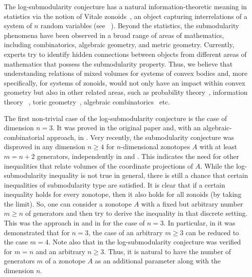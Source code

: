 \documentclass[11pt]{amsart}
\newcommand{\Ivan}[1]{\todo[size=\tiny,inline,color=green!30]{#1 \\ \hfill --- Vanya}}
\theoremstyle{definition}
\theoremstyle{remark}
\begin{document}
The log-submodularity conjecture %
has a natural information-theoretic meaning in statistics via the notion of Vitale zonoids~\cite{V}, an object capturing interrelations of a system of $n$ random variables (see ~\cite{CC,DCT,Md}). Beyond the statistics, the submodularity phenomena have been observed in a broad range of areas of mathematics, including combinatorics, algebraic geometry, and metric %
geometry. Currently, experts try to identify hidden connections between objects from different areas of mathematics that possess the submodularity property. Thus, %
we believe that understanding relations of mixed volumes for systems of convex bodies and, more specifically, for systems of zonoids, would not only have an impact %
within convex geometry but also in other related areas, such as probability theory~\cite{BBLM}, information theory ~\cite{CC, DCT, Md}, toric geometry~\cite{Ful, CLS}, algebraic combinatorics~\cite{BH, AH, Mur, Bjo} etc.

The first non-trivial case of the log-submodularity conjecture is the case of dimension $n=3$. It was proved in the original paper \cite{FMMZ} and, with an algebraic-combinatorial approach, in \cite{AS}. %
Very recently, the submodularity conjecture was disproved in any dimension $n \geq 4$ for $n$-dimensional zonotopes $A$ with at least $m = n+2$ generators, independently in \cite{FHMNZ} and \cite{Sko}.
This indicates the need for other inequalities that relate volumes of the coordinate projections of $A$. While the log-submodularity inequality is not true in general, there is still a chance that certain inequalities of submodularity type are satisfied. It is clear that if a certain inequality holds for every zonotope, then it also holds for all zonoids (by taking the limit). So, one can consider a zonotope $A$ with a fixed but arbitrary number $m \ge n$ of generators and then try to derive the inequality in that discrete setting.  This was the approach in \cite{FMMZ} and in \cite{AS} for the case of $n=3$. In particular, in \cite{AS} it was demonstrated that for $n=3$, the case of an arbitrary $m \ge 3$ can be reduced to the case $m=4$. Note also that in \cite{FMMZ} the  log-submodularity conjecture was verified for $m=n$ and an arbitrary $n \geq 3$. Thus, it is natural to have the number of generators $m$ of a zonotope $A$ as an additional parameter along with the dimension $n$. 
\end{document}
